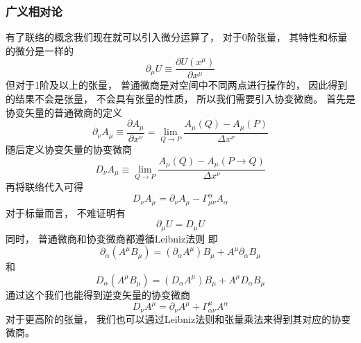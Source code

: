 \documentclass[8pt]{beamer}
\begin{document}
        \begin{frame}[fragile]
            \frametitle{广义相对论}
            \begin{multicols}{2} 
                \qquad
                有了联络的概念我们现在就可以引入微分运算了，
                对于0阶张量，
                其特性和标量的微分是一样的
                $$\partial_{\mu}U\equiv\frac{\partial U(x^{\mu})}{\partial x^{\mu}}$$
                但对于1阶及以上的张量，
                普通微商是对空间中不同两点进行操作的，
                因此得到的结果不会是张量，
                不会具有张量的性质，
                所以我们需要引入协变微商。
                首先是协变矢量的普通微商的定义
                $$\partial_{\nu}A_{\mu}\equiv\frac{\partial A_{\mu}}{\partial x^{\nu}}=\lim_{Q\to P}\frac{A_{\mu}(Q)-A_{\mu}(P)}{\Delta  x^{\nu}}$$
                随后定义协变矢量的协变微商
                $$D_{\nu}A_{\mu}\equiv\lim_{Q\to P}\frac{A_{\mu}(Q)-A_{\mu}(P\to Q)}{\Delta  x^{\nu}}$$
                再将联络代入可得
                $$D_{\nu}A_{\mu}=\partial_{\nu}A_{\mu}-\varGamma ^{\alpha}_{\mu\nu}A_{\alpha}$$
                对于标量而言，
                不难证明有
                $$\partial_{\mu}U=D_{\mu}U$$
                同时，
                普通微商和协变微商都遵循Leibniz法则
                即$$\partial_{\alpha}(A^{\mu}B_{\mu})=(\partial_{\alpha}A^{\mu})B_{\mu}+A^{\mu}\partial_{\alpha}B_{\mu}$$
                和$$D_{\alpha}(A^{\mu}B_{\mu})=(D_{\alpha}A^{\mu})B_{\mu}+A^{\mu}D_{\alpha}B_{\mu}$$
                通过这个我们也能得到逆变矢量的协变微商
                $$D_{\nu}A^{\mu}=\partial_{\nu}A^{\mu}+\varGamma ^{\mu}_{\alpha\nu}A^{\alpha}$$
                对于更高阶的张量，
                我们也可以通过Leibniz法则和张量乘法来得到其对应的协变微商。
            \end{multicols}
        \end{frame}
\end{document}
